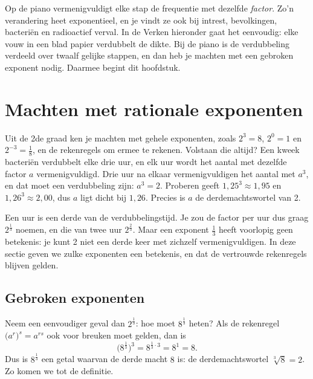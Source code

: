 Op de piano vermenigvuldigt elke stap de frequentie met dezelfde \textit{factor}. Zo'n verandering heet exponentieel, en je vindt ze ook bij intrest, bevolkingen, bacteriën en radioactief verval. In de Verken hieronder gaat het eenvoudig: elke vouw in een blad papier verdubbelt de dikte. Bij de piano is de verdubbeling verdeeld over twaalf gelijke stappen, en dan heb je machten met een gebroken exponent nodig. Daarmee begint dit hoofdstuk.

\begin{oefeningen}[Start]

\end{oefeningen}

\section{Machten met rationale exponenten}

Uit de 2de graad ken je machten met gehele exponenten, zoals $2^3 = 8$, $2^0 = 1$ en $2^{-3} = \frac18$, en de rekenregels om ermee te rekenen. Volstaan die altijd? Een kweek bacteriën verdubbelt elke drie uur, en elk uur wordt het aantal met dezelfde factor $a$ vermenigvuldigd. Drie uur na elkaar vermenigvuldigen het aantal met $a^3$, en dat moet een verdubbeling zijn: $a^3 = 2$. Proberen geeft $1{,}25^3 \approx 1{,}95$ en $1{,}26^3 \approx 2{,}00$, dus $a$ ligt dicht bij $1{,}26$. Precies is $a$ de derdemachtswortel van 2.

Een uur is een derde van de verdubbelingstijd. Je zou de factor per uur dus graag $2^{\frac13}$ noemen, en die van twee uur $2^{\frac23}$. Maar een exponent $\frac13$ heeft voorlopig geen betekenis: je kunt 2 niet een derde keer met zichzelf vermenigvuldigen. In deze sectie geven we zulke exponenten een betekenis, en  dat de vertrouwde rekenregels blijven gelden.

\subsection{Gebroken exponenten}

Neem een eenvoudiger geval dan $2^{\frac13}$: hoe moet $8^{\frac13}$ heten? Als de rekenregel $\bigl(a^r\bigr)^s = a^{rs}$ ook voor breuken moet gelden, dan is
\[\bigl(8^{\frac13}\bigr)^3 = 8^{\frac13 \cdot 3} = 8^1 = 8 .\]
Dus is $8^{\frac13}$ een getal waarvan de derde macht $8$ is: de derdemachtswortel $\sqrt[3]{8} = 2$. Zo komen we tot de definitie.

